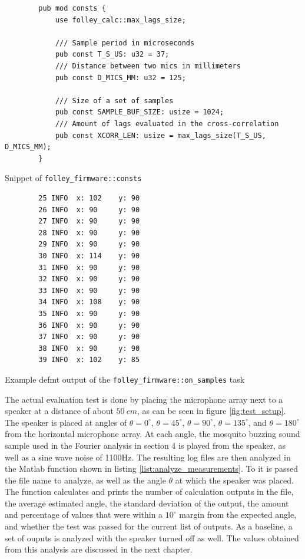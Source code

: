 \documentclass[a4paper]{article}
\newcommand{\rust}[1]{\texttt{#1}}
\begin{document}
\begin{listing}[H]
    \begin{verbatim}
        pub mod consts {
            use folley_calc::max_lags_size;

            /// Sample period in microseconds
            pub const T_S_US: u32 = 37;
            /// Distance between two mics in millimeters
            pub const D_MICS_MM: u32 = 125;

            /// Size of a set of samples
            pub const SAMPLE_BUF_SIZE: usize = 1024;
            /// Amount of lags evaluated in the cross-correlation
            pub const XCORR_LEN: usize = max_lags_size(T_S_US, D_MICS_MM);
        }
    \end{verbatim}
    \caption{Snippet of \rust{folley_firmware::consts}}
    \label{list:consts}
\end{listing}

\begin{listing}[H]
    \begin{verbatim}
        25 INFO  x: 102    y: 90
        26 INFO  x: 90     y: 90
        27 INFO  x: 90     y: 90
        28 INFO  x: 90     y: 90
        29 INFO  x: 90     y: 90
        30 INFO  x: 114    y: 90
        31 INFO  x: 90     y: 90
        32 INFO  x: 90     y: 90
        33 INFO  x: 90     y: 90
        34 INFO  x: 108    y: 90
        35 INFO  x: 90     y: 90
        36 INFO  x: 90     y: 90
        37 INFO  x: 90     y: 90
        38 INFO  x: 90     y: 90
        39 INFO  x: 102    y: 85
    \end{verbatim}
    \caption{Example defmt output of the \rust{folley_firmware::on_samples} task}
    \label{list:defmt_output}
\end{listing}

The actual evaluation test is done by placing the microphone array next to a speaker at a distance of about $50\ cm$, as can be seen in figure \ref{fig:test_setup}. The speaker is placed at angles of $\theta = 0^{\circ}$, $\theta = 45^{\circ}$, $\theta = 90^{\circ}$, $\theta = 135^{\circ}$, and $\theta = 180^{\circ}$ from the horizontal microphone array. At each angle, the mosquito buzzing sound sample used in the Fourier analysis in section 4 is played from the speaker, as well as a sine wave noise of 1100Hz. The resulting log files are then analyzed in the Matlab function shown in listing \ref{list:analyze_measurements}. To it is passed the file name to analyze, as well as the angle $\theta$ at which the speaker was placed. The function calculates and prints the number of calculation outputs in the file, the average estimated angle, the standard deviation of the output, the amount and percentage of values that were within a $10^{\circ}$ margin from the expected angle, and whether the test was passed for the current list of outputs. As a baseline, a set of ouputs is analyzed with the speaker turned off as well. The values obtained from this analysis are discussed in the next chapter.
\end{document}
